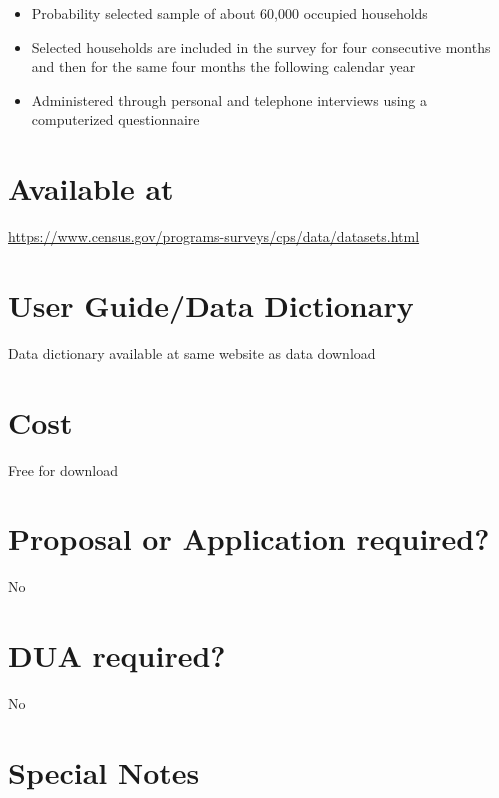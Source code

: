 \documentclass[
]{book}
\providecommand{\tightlist}{%
  \setlength{\itemsep}{0pt}\setlength{\parskip}{0pt}}
\begin{document}
\begin{itemize}
\tightlist
\item
  Probability selected sample of about 60,000 occupied households
\item
  Selected households are included in the survey for four consecutive months and then for the same four months the following calendar year
\item
  Administered through personal and telephone interviews using a computerized questionnaire
\end{itemize}

\hypertarget{available-at-22}{%
\section{Available at}\label{available-at-22}}

\url{https://www.census.gov/programs-surveys/cps/data/datasets.html}

\hypertarget{user-guidedata-dictionary-22}{%
\section{User Guide/Data Dictionary}\label{user-guidedata-dictionary-22}}

Data dictionary available at same website as data download

\hypertarget{cost-22}{%
\section{Cost}\label{cost-22}}

Free for download

\hypertarget{proposal-or-application-required-22}{%
\section{Proposal or Application required?}\label{proposal-or-application-required-22}}

No

\hypertarget{dua-required-22}{%
\section{DUA required?}\label{dua-required-22}}

No

\hypertarget{special-notes-22}{%
\section{Special Notes}\label{special-notes-22}}
\end{document}
